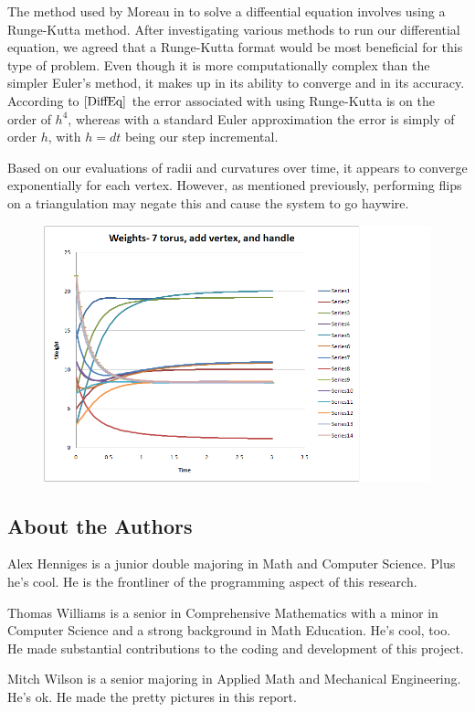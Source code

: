 \documentclass[12pt]{article}
\begin{document}
The method used by Moreau in \cite{JPM} to solve a diffeential equation involves using a Runge-Kutta method. After investigating various methods to run our differential equation, we agreed that a Runge-Kutta format would be most beneficial for this type of problem. Even though it is more computationally complex than the simpler Euler's method, it makes up in its ability to converge and in its accuracy. According to $\cite{DiffEq}$ the error associated with using Runge-Kutta is on the order of $h^4$, whereas with a standard Euler approximation the error is simply of order $h$, with $h = dt$ being our step incremental. \newline

\noindent Based on our evaluations of radii and curvatures over time, it appears to converge exponentially for each vertex. However, as mentioned previously, performing flips on a triangulation may negate this and cause the system to go haywire. 

\begin{figure}[ht]
\centering
\includegraphics[scale = 0.9]{torus7addvaddhweights.png}
\end{figure}
  
\newpage
\subsection*{About the Authors}
\maketitle
  
Alex Henniges is a junior double majoring in Math and Computer Science. Plus he's cool. He is the frontliner of the programming aspect of this research. \newline
  
\noindent Thomas Williams is a senior in Comprehensive Mathematics with a minor in Computer Science and a strong background in Math Education. He's cool, too. He made substantial contributions to the coding and development of this project.\newline
  
\noindent Mitch Wilson is a senior majoring in Applied Math and Mechanical Engineering. He's ok. He made the pretty pictures in this report. 
\end{document}
